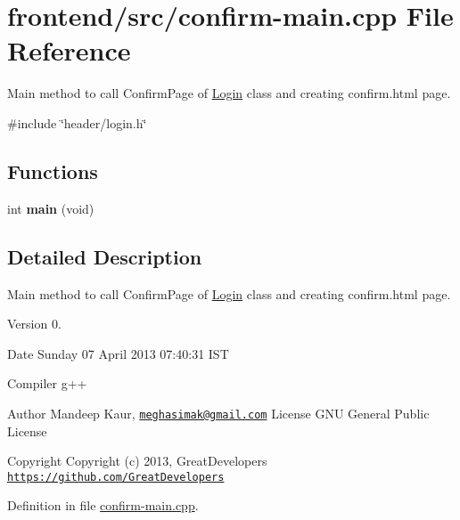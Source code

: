 \hypertarget{confirm-main_8cpp}{\section{frontend/src/confirm-\/main.cpp \-File \-Reference}
\label{confirm-main_8cpp}
}


\-Main method to call \-Confirm\-Page of \hyperlink{classLogin}{\-Login} class and creating confirm.\-html page.  


{\ttfamily \#include \char`\"{}header/login.\-h\char`\"{}}\*
\subsection*{\-Functions}
\begin{DoxyCompactItemize}
\item 
\hypertarget{confirm-main_8cpp_a840291bc02cba5474a4cb46a9b9566fe}{int {\bfseries main} (void)}\label{confirm-main_8cpp_a840291bc02cba5474a4cb46a9b9566fe}

\end{DoxyCompactItemize}


\subsection{\-Detailed \-Description}
\-Main method to call \-Confirm\-Page of \hyperlink{classLogin}{\-Login} class and creating confirm.\-html page. \begin{DoxyVersion}{\-Version}
0. 
\end{DoxyVersion}
\begin{DoxyDate}{\-Date}
\-Sunday 07 \-April 2013 07\-:40\-:31 \-I\-S\-T\par
 \-Compiler g++
\end{DoxyDate}
\begin{DoxyAuthor}{\-Author}
\-Mandeep \-Kaur, \href{mailto:meghasimak@gmail.com}{\tt meghasimak@gmail.\-com} \-License \-G\-N\-U \-General \-Public \-License 
\end{DoxyAuthor}
\begin{DoxyCopyright}{\-Copyright}
\-Copyright (c) 2013, \-Great\-Developers \href{https://github.com/GreatDevelopers}{\tt https\-://github.\-com/\-Great\-Developers} 
\end{DoxyCopyright}


\-Definition in file \hyperlink{confirm-main_8cpp_source}{confirm-\/main.\-cpp}.

